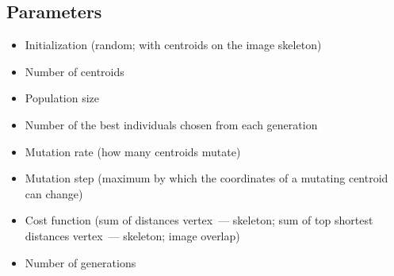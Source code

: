 \documentclass[a1,portrait]{a0poster}
\begin{document}
\begin{multicols}{2}
\subsection*{Parameters} 

\begin{itemize}
	\item Initialization (random; with centroids on the image skeleton)
	\item Number of centroids
	\item Population size
	\item Number of the best individuals chosen from each generation
	\item Mutation rate (how many centroids mutate)
	\item Mutation step (maximum by which the coordinates of a mutating centroid can change)
	\item Cost function (sum of distances vertex~--- skeleton; sum of top shortest distances vertex~--- skeleton; image overlap)
	\item Number of generations
\end{itemize}


\begin{center}
	

\end{center}
\end{multicols}
\end{document}
